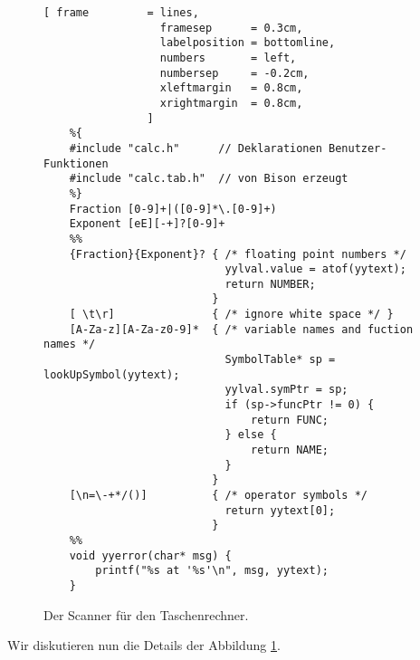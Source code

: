 \begin{figure}[!ht]
\centering
\begin{Verbatim}[ frame         = lines, 
                  framesep      = 0.3cm, 
                  labelposition = bottomline,
                  numbers       = left,
                  numbersep     = -0.2cm,
                  xleftmargin   = 0.8cm,
                  xrightmargin  = 0.8cm,
                ]
    %{
    #include "calc.h"      // Deklarationen Benutzer-Funktionen
    #include "calc.tab.h"  // von Bison erzeugt
    %}
    Fraction [0-9]+|([0-9]*\.[0-9]+)
    Exponent [eE][-+]?[0-9]+    
    %%
    {Fraction}{Exponent}? { /* floating point numbers */
                            yylval.value = atof(yytext);
                            return NUMBER;
                          }    
    [ \t\r]               { /* ignore white space */ }
    [A-Za-z][A-Za-z0-9]*  { /* variable names and fuction names */
                            SymbolTable* sp = lookUpSymbol(yytext);
                            yylval.symPtr = sp;
                            if (sp->funcPtr != 0) {
                                return FUNC;
                            } else {
                                return NAME;
                            }
                          }    
    [\n=\-+*/()]          { /* operator symbols */ 
                            return yytext[0]; 
                          }    
    %%
    void yyerror(char* msg) {
        printf("%s at '%s'\n", msg, yytext);
    }
\end{Verbatim}
\vspace*{-0.3cm}
\caption{Der Scanner f\"ur den Taschenrechner.}
\label{fig:calc.l}
\end{figure}
Wir diskutieren nun die Details der Abbildung \ref{fig:calc.l}.
